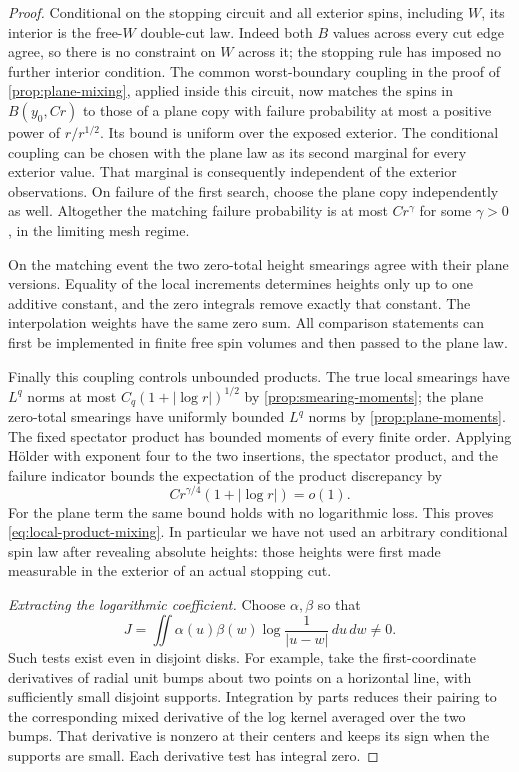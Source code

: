 \begin{proof}
Conditional on the stopping circuit and all exterior spins,
including $W$, its interior is the free-$W$ double-cut law. Indeed
both $B$ values across every cut edge agree, so there is no constraint
on $W$ across it; the stopping rule has imposed no further interior
condition. The common worst-boundary coupling in the proof of
\cref{prop:plane-mixing}, applied inside this circuit, now matches
the spins in $B(y_0,Cr)$ to those of a plane copy with failure
probability at most a positive power of $r/r^{1/2}$. Its bound is
uniform over the exposed exterior. The conditional coupling can
be chosen with the plane law as its second marginal for every
exterior value. That marginal is consequently independent of the
exterior observations. On failure of the first search, choose
the plane copy independently as well. Altogether the matching
failure probability is at most $C r^\gamma$ for some $\gamma>0$,
in the limiting mesh regime.

On the matching event the two zero-total height smearings agree
with their plane versions. Equality of the local increments
determines heights only up to one additive constant, and the zero
integrals remove exactly that constant. The interpolation weights
have the same zero sum. All comparison statements can first be
implemented in finite free spin volumes and then passed to the
plane law.

Finally this coupling controls unbounded products. The true local
smearings have $L^q$ norms at most
$C_q(1+|\log r|)^{1/2}$ by \cref{prop:smearing-moments}; the plane
zero-total smearings have uniformly bounded $L^q$ norms by
\cref{prop:plane-moments}. The fixed spectator product has bounded
moments of every finite order. Applying H\"older with exponent
four to the two insertions, the spectator product, and the failure
indicator bounds the expectation of the product discrepancy by
\begin{equation}
                    C r^{\gamma/4}(1+|\log r|)=o(1).
 \label{eq:mixing-error-log}
\end{equation}
For the plane term the same bound holds with no logarithmic loss.
This proves \eqref{eq:local-product-mixing}. In particular we have
not used an arbitrary conditional spin law after revealing absolute
heights: those heights were first made measurable in the exterior
of an actual stopping cut.

\emph{Extracting the logarithmic coefficient.}
Choose $\alpha,\beta$ so that
\begin{equation}
 J=\iint\alpha(u)\beta(w)\log\frac1{|u-w|}\,du\,dw\ne0.
 \label{eq:nonzero-log-pairing}
\end{equation}
Such tests exist even in disjoint disks. For example, take the
first-coordinate derivatives of radial unit bumps about two points
on a horizontal line, with sufficiently small disjoint supports.
Integration by parts reduces their pairing to the corresponding
mixed derivative of the log kernel averaged over the two bumps.
That derivative is nonzero at their centers and keeps its sign
when the supports are small. Each derivative test has integral
zero.


\end{proof}
